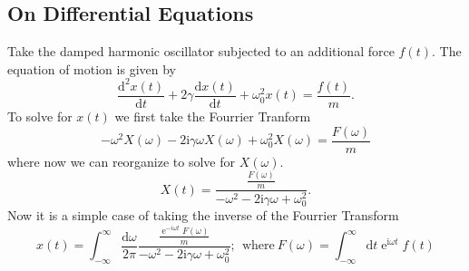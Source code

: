 \documentclass[]{report}
\DeclareMathOperator{\ee}{e}
\newcommand{\ii}{\mathrm{i}}
\newcommand{\dd}{\mathrm{d}}
\numberwithin{equation}{section} %
\begin{document}
\subsection{On Differential Equations}

Take the damped harmonic oscillator subjected to an additional force $f(t)$. The equation of motion is given by 
$$
\frac{\dd^2 x(t)}{\dd t} + 2\gamma \frac{\dd x(t)}{\dd t} + \omega_0^2 x(t) = \frac{f(t)}{m}.
$$ 
To solve for $x(t)$ we first take the Fourrier Tranform
$$
-\omega^2 X(\omega) - 2\ii \gamma \omega X(\omega) + \omega_0^2 X(\omega) = \frac{F(\omega)}{m}
$$ 
where now we can reorganize to solve for $X(\omega)$.
$$
X(t) = \frac{\frac{F(\omega)}{m}}{-\omega^2 - 2\ii \gamma \omega + \omega_0^2}.
$$
Now it is a simple case of taking the inverse of the Fourrier Transform
$$
x(t) = \int_{-\infty}^{\infty} \frac{\dd \omega}{2\pi} \frac{\frac{\ee^{-i\omega t} F(\omega)}{m}}{-\omega^2 - 2\ii \gamma \omega + \omega_0^2}; \ \ \text{where} \ F(\omega) = \int_{-\infty}^{\infty} \dd t \ee^{\ii \omega t} f(t)  
$$
\end{document}
